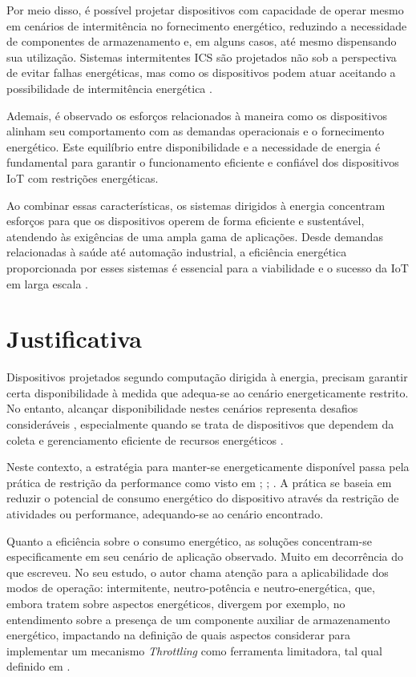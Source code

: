 Por meio disso, é possível projetar dispositivos com capacidade de operar mesmo em cenários de intermitência no fornecimento energético, reduzindo a necessidade de componentes de armazenamento e, em alguns casos, até mesmo dispensando sua utilização. Sistemas intermitentes \acs{ICS} são projetados não sob a perspectiva de evitar falhas energéticas, mas como os dispositivos podem atuar aceitando a possibilidade de intermitência energética .

Ademais, é observado os esforços relacionados à maneira como os dispositivos alinham seu comportamento com as demandas operacionais e o fornecimento energético. Este equilíbrio entre disponibilidade e a necessidade de energia é fundamental para garantir o funcionamento eficiente e confiável dos dispositivos \acs{IoT} com restrições energéticas.

Ao combinar essas características, os sistemas dirigidos à energia concentram esforços para que os dispositivos operem de forma eficiente e sustentável, atendendo às exigências de uma ampla gama de aplicações. Desde demandas relacionadas à saúde até automação industrial, a eficiência energética proporcionada por esses sistemas é essencial para a viabilidade e o sucesso da IoT em larga escala \cite{asghari_internet_2019}.


\section{Justificativa}

Dispositivos projetados segundo computação dirigida à energia, precisam garantir certa disponibilidade à medida que adequa-se ao cenário energeticamente restrito. No entanto, alcançar disponibilidade nestes cenários representa desafios consideráveis \cite{sudevalayam_energy_2011}, especialmente quando se trata de dispositivos que dependem da coleta e gerenciamento eficiente de recursos energéticos . 

Neste contexto, a estratégia para manter-se energeticamente disponível passa pela prática de restrição da performance como visto em ; ; . A prática se baseia em reduzir o potencial de consumo energético do dispositivo através da restrição de atividades ou performance, adequando-se ao cenário encontrado. 

Quanto a eficiência sobre o consumo energético, as soluções concentram-se especificamente em seu cenário de aplicação observado. Muito em decorrência do que  escreveu. No seu estudo, o autor chama atenção para a aplicabilidade dos modos de operação: intermitente, neutro-potência e neutro-energética, que, embora tratem sobre aspectos energéticos, divergem por exemplo, no entendimento sobre a presença de um componente auxiliar de armazenamento energético, impactando na definição de quais aspectos considerar para implementar um mecanismo \textit{Throttling} como ferramenta limitadora, tal qual definido em \cite{burns_designing_nodate}. 

